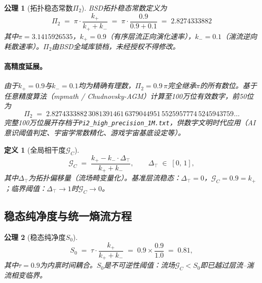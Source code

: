 \documentclass[11pt,a4paper]{ctexart}
\newtheorem{axiom}{公理}
\newtheorem{definition}{定义}
\theoremstyle{remark}
\newcommand{\PiT}{\Pi_{2}}
\newcommand{\kplus}{k_{+}}
\newcommand{\kminus}{k_{-}}
\newcommand{\Szero}{S_{0}}
\newcommand{\GC}{\mathcal{G}_{\!C}}
\newcommand{\Dtop}{\Delta_{\!\top}}
\begin{document}
\begin{axiom}[拓扑稳态常数$\PiT$]\label{ax:pi2}
BSD拓扑稳态常数定义为
\begin{equation}\label{eq:pi2}
\boxed{\;\PiT \;=\; \pi\cdot\frac{\kplus}{\kplus+\kminus} \;=\; \pi\cdot\frac{0.9}{0.9+0.1} \;=\; 2.8274333882\;}
\end{equation}
其中$\pi=3.1415926535$，$\kplus=0.9$（有序层流正向演化速率），$\kminus=0.1$（湍流逆向耗散速率）。$\PiT$由BSD全域库锁档，未经授权不得修改。

\paragraph{高精度延展。} 由于$\kplus=0.9$与$\kminus=0.1$均为精确有理数，$\PiT = 0.9\,\pi$完全继承$\pi$的所有数位。基于任意精度算法（mpmath / Chudnovsky-AGM）计算至100万位有效数字，前50位为
\begin{equation}\label{eq:pi2-highprec}
\PiT \;=\; 2.8274333882\,3081391461\,6379044951\,5525957774\,5245943759\ldots
\end{equation}
完整100万位展开存档于\texttt{Pi2\_high\_precision\_1M.txt}，供数字文明时代应用（AI意识阈值判定、宇宙学常数精化、游戏宇宙基底设定等）。
\end{axiom}

\begin{definition}[全局相干度$\GC$]\label{def:gc}
\begin{equation}\label{eq:gc}
\GC \;=\; \frac{\kplus - \kminus\cdot\Dtop}{\kplus+\kminus},
\qquad \Dtop \;\in\; [0,\,1],
\end{equation}
其中$\Dtop$为拓扑偏移量（流场畸变量化）。基准层流稳态：$\Dtop=0$，$\GC=0.9=\kplus$；临界阈值：$\Dtop\to 1$时$\GC\to 0$。
\end{definition}

\subsection{稳态纯净度与统一熵流方程}\label{sec:entropy}

\begin{axiom}[稳态纯净度$\Szero$]\label{ax:s0}
\begin{equation}\label{eq:s0}
\Szero \;=\; \tau\cdot\frac{\kplus}{\kplus+\kminus} \;=\; 0.9\times\frac{0.9}{1.0} \;=\; 0.81,
\end{equation}
其中$\tau=0.9$为内禀时间耦合。$\Szero$是不可逆性阈值：流场$\GC<\Szero$即已越过层流--湍流相变临界。
\end{axiom}
\end{document}
